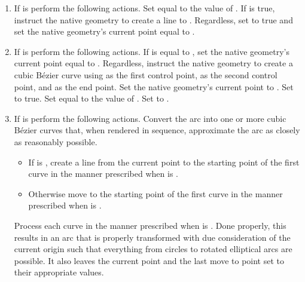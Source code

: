 \begin{enumerate}
\begin{enumerate}
	\item
	If  is  perform the following actions. Set  equal to the value of . If  is true, instruct the native geometry to create a line to . Regardless, set  to true and set the native geometry's current point equal to .
	
	\item
	If  is  perform the following actions. If  is equal to , set the native geometry's current point equal to . Regardless, instruct the native geometry to create a cubic B\'{e}zier curve using  as the first control point,  as the second control point, and  as the end point. Set the native geometry's current point to . Set  to true. Set  equal to the value of . Set  to .
	
	
	\item
	If  is  perform the following actions. Convert the arc into one or more cubic B\'ezier curves that, when rendered in sequence, approximate the arc as closely as reasonably possible.
	\begin{itemize}
		\item
		If  is , create a line from the current point to the starting point of the first curve in the manner prescribed when  is .
		\item
		Otherwise move to the starting point of the first curve in the manner prescribed when  is .
	\end{itemize}
	Process each curve in the manner prescribed when  is . \enternote Done properly, this results in an arc that is properly transformed with due consideration of the current origin such that everything from circles to rotated elliptical arcs are possible. It also leaves the current point and the last move to point set to their appropriate values. \exitnote
	

\end{enumerate}
\end{enumerate}
